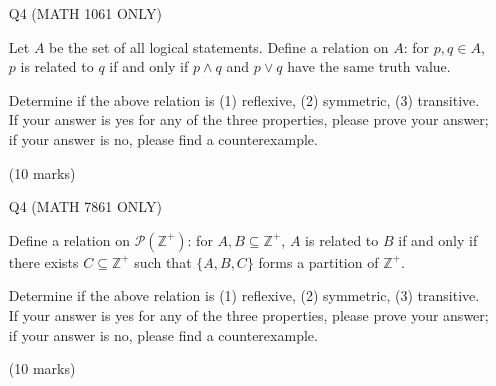 \documentclass[a4paper]{gtart}
\begin{document}
\begin{enumerate}
(3) Is the set $\mathbb{Z}^
+\times\dots\times \mathbb{Z}^+$ (Cartesian product $n$ times) countable? A yes or no would suffice.

\hfill  (15 marks)

\medskip

\item[Q4] (MATH 1061 ONLY)
 
Let $A$ be the set of all logical statements. Define a relation on $A$: for $p,q\in A$, $p$ is related to $q$ if and only if $p\wedge q$ and $p\vee q$ have the same truth value. 

Determine if the above relation is (1) reflexive, (2) symmetric, (3) transitive. If your answer is yes for any of the three properties, please prove your answer;  if your answer is no, please find a counterexample.
 




\hfill  (10 marks)

\item[Q4] (MATH 7861 ONLY)


Define a relation on $\mathcal{P}(\mathbb{Z}^+)$: for $A,B\subseteq \mathbb{Z}^+$, $A$ is related to $B$ if and only if there exists $C\subseteq \mathbb{Z}^{+}$ such that $\{A,B,C\}$ forms a partition of $\mathbb{Z}^+$.

Determine if the above relation is (1) reflexive, (2) symmetric, (3) transitive. If your answer is yes for any of the three properties, please prove your answer;  if your answer is no, please find a counterexample.
 
\hfill  (10 marks)


\end{enumerate}
\end{document}
